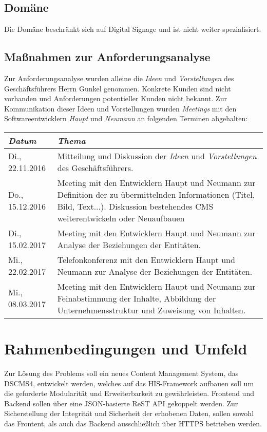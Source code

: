 \documentclass[a4paper]{article}
\begin{document}
	\subsection{Domäne}
	Die Domäne beschränkt sich auf Digital Signage und ist nicht weiter spezialisiert.
	\subsection{Maßnahmen zur Anforderungsanalyse}
	Zur Anforderungsanalyse wurden alleine die \emph{Ideen} und \emph{Vorstellungen} des Geschäftsführers Herrn Gunkel genommen.
	Konkrete Kunden sind nicht vorhanden und Anforderungen potentieller Kunden nicht bekannt.
	Zur Kommunikation dieser Ideen und Vorstellungen wurden \emph{Meetings} mit den Softwareentwicklern \emph{Haupt} und \emph{Neumann} an folgenden Terminen abgehalten:
	\begin{center}
		\begin{tabular}{|p{}|p{}|}
			\hline
			\emph{Datum} & \emph{Thema} \\
			\hline
			Di., 22.11.2016 & Mitteilung und Diskussion der \emph{Ideen} und \emph{Vorstellungen} des Geschäftsführers. \\
			\hline
			Do., 15.12.2016 &Meeting mit den Entwicklern Haupt und Neumann zur Definition der zu übermittelnden Informationen (Titel, Bild, Text...).
       		Diskussion bestehendes CMS weiterentwickeln oder Neuaufbauen
			\\
			\hline
			Di., 15.02.2017 & Meeting mit den Entwicklern Haupt und Neumann zur Analyse der Beziehungen der Entitäten. \\
			\hline
			Mi., 22.02.2017 & Telefonkonferenz mit den Entwicklern Haupt und Neumann zur Analyse der Beziehungen der Entitäten. \\
			\hline
			Mi., 08.03.2017 & Meeting mit den Entwicklern Haupt und Neumann zur Feinabstimmung der Inhalte, Abbildung der Unternehmensstruktur und Zuweisung von Inhalten. \\
			\hline	
		\end{tabular}
	\end{center}
	
	\pagebreak
	\section{Rahmenbedingungen und Umfeld}
	Zur Lösung des Problems soll ein neues Content Management System, das DSCMS4, entwickelt werden, welches auf das HIS-Framework aufbauen soll um die geforderte Modularität und Erweiterbarkeit zu gewährleisten.
	Frontend und Backend sollen über eine JSON-basierte ReST API gekoppelt werden.
	Zur Sicherstellung der Integrität und Sicherheit der erhobenen Daten, sollen sowohl das Frontent, als auch das Backend ausschließlich über HTTPS betrieben werden.
\end{document}
